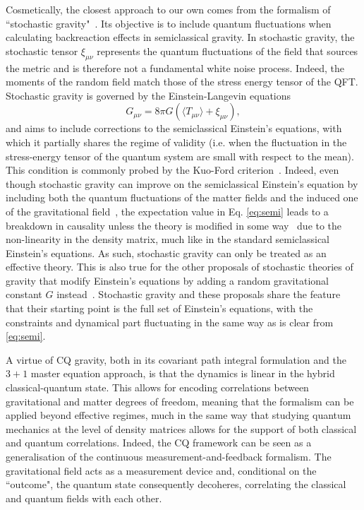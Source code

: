 \documentclass[amsmath,amssymb,11pt]{article}
\begin{document}
Cosmetically, the closest approach to our own comes from the formalism of “stochastic gravity"~\cite{hu2008stochastic}. Its objective is to include quantum fluctuations when calculating backreaction effects in semiclassical gravity. In stochastic gravity, the stochastic tensor $\xi_{\mu \nu}$ represents the quantum fluctuations of the field that sources the metric and is therefore not a fundamental white noise process. Indeed, the moments of the random field match those of the stress energy tensor of the QFT. Stochastic gravity is governed by the Einstein-Langevin equations 
\begin{equation}
    G_{\mu\nu} = 8\pi G \left(\langle  T_{\mu\nu} \rangle + \xi_{\mu\nu}\right),\label{eq:semi}
\end{equation}
and aims to include corrections to the semiclassical Einstein's equations, with which it partially shares the regime of validity (i.e. when the fluctuation in the stress-energy tensor of the quantum system are small with respect to the mean). This condition is commonly probed by the Kuo-Ford criterion~\cite{kuo1993semiclassical}. Indeed, even though stochastic gravity can improve on the semiclassical Einstein's equation by including both the quantum fluctuations of the matter fields and the induced one of the gravitational field~\cite{ahmed2024semiclassical}, the expectation value in Eq. \eqref{eq:semi} leads to a breakdown in causality unless the theory is modified in some way~\cite{gisin1990weinbergs,polchinski1991weinbergs} due to the non-linearity in the density matrix, much like in the standard semiclassical Einstein's equations. As such, stochastic gravity can only be treated as an effective theory. This is also true for the other proposals of stochastic theories of gravity that modify Einstein's equations by adding a random gravitational constant $G$ instead~\cite{moffat1997stochastic,decesare2016effective}. Stochastic gravity and these proposals share the feature that their starting point is the full set of Einstein's equations, with the constraints and dynamical part fluctuating in the same way as is clear from \eqref{eq:semi}. 

A virtue of CQ gravity, both in its covariant path integral formulation and the $3+1$ master equation approach, is that the dynamics is linear in the hybrid classical-quantum state. This allows for encoding correlations between gravitational and matter degrees of freedom, meaning that the formalism can be applied beyond effective regimes, much in the same way that studying quantum mechanics at the level of density matrices allows for the support of both classical and quantum correlations. Indeed, the CQ framework can be seen as a generalisation of the continuous measurement-and-feedback formalism. The gravitational field acts as a measurement device and, conditional on the “outcome", the quantum state consequently decoheres, correlating the classical and quantum fields with each other. 
\end{document}
